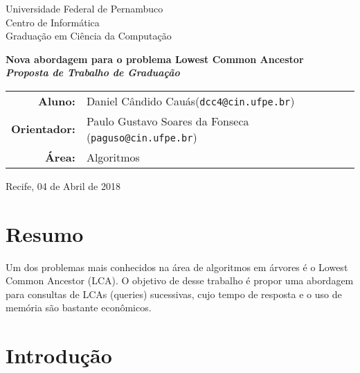 \documentclass[12pt, a4paper, oneside]{article}
\newcommand{\A}{\ensuremath{\mathtt{A}}\xspace}
\newcommand{\C}{\ensuremath{\mathtt{C}}\xspace}
\newcommand{\G}{\ensuremath{\mathtt{G}}\xspace}
\newcommand{\T}{\ensuremath{\mathtt{T}}\xspace}
\begin{document}


\thispagestyle{empty}
\begin{center}
\Large
Universidade Federal de Pernambuco\\
Centro de Informática\\
Graduação em Ciência da Computação

\vfill

{\huge \bfseries Nova abordagem para o problema Lowest Common Ancestor}
\\
\medskip
{\bfseries\itshape Proposta de Trabalho de Graduação}

\vfill

\bigskip

	\begin{tabular}{r p{95mm}}
	\textbf{Aluno: } & Daniel Cândido Cauás\newline(\texttt{dcc4@cin.ufpe.br}) \\ 
\textbf{Orientador: } & Paulo Gustavo Soares da Fonseca \newline(\texttt{paguso@cin.ufpe.br})
\\
	\textbf{Área: } & Algoritmos
\end{tabular}

	\vspace{3cm}
Recife, 04 de Abril de 2018
\end{center}

\clearpage 
\thispagestyle{empty}
\section{Resumo}
Um dos problemas mais conhecidos na área de algoritmos em árvores é o Lowest Common Ancestor (LCA). O objetivo de desse trabalho é propor uma abordagem para consultas de LCAs (queries) sucessivas, cujo tempo de resposta e o uso de memória são bastante econômicos.

\clearpage
\setcounter{page}{1}
\section{Introdução}

\end{document}
